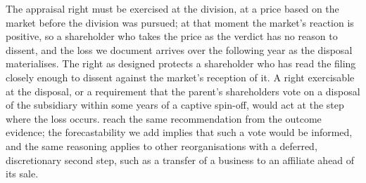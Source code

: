 The appraisal right must be exercised at the division, at a price based on the market before the division was pursued; at that moment the market's reaction is positive, so a shareholder who takes the price as the verdict has no reason to dissent, and the loss we document arrives over the following year as the disposal materialises. The right as designed protects a shareholder who has read the filing closely enough to dissent against the market's reception of it. A right exercisable at the disposal, or a requirement that the parent's shareholders vote on a disposal of the subsidiary within some years of a captive spin-off, would act at the step where the loss occurs.  reach the same recommendation from the outcome evidence; the forecastability we add implies that such a vote would be informed, and the same reasoning applies to other reorganisations with a deferred, discretionary second step, such as a transfer of a business to an affiliate ahead of its sale.
